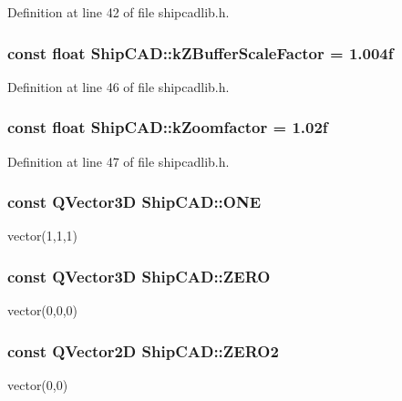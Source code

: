 Definition at line 42 of file shipcadlib.\-h.

\hypertarget{namespaceShipCAD_a519c591e5f5e3f60603b3133a4a2094e}{
\subsubsection[{k\-Z\-Buffer\-Scale\-Factor}]{\setlength{\rightskip}{0pt plus 5cm}const float Ship\-C\-A\-D\-::k\-Z\-Buffer\-Scale\-Factor = 1.\-004f}}\label{namespaceShipCAD_a519c591e5f5e3f60603b3133a4a2094e}


Definition at line 46 of file shipcadlib.\-h.

\hypertarget{namespaceShipCAD_a80babe3fef93f1117e1c410f8d3c22c2}{
\subsubsection[{k\-Zoomfactor}]{\setlength{\rightskip}{0pt plus 5cm}const float Ship\-C\-A\-D\-::k\-Zoomfactor = 1.\-02f}}\label{namespaceShipCAD_a80babe3fef93f1117e1c410f8d3c22c2}


Definition at line 47 of file shipcadlib.\-h.

\hypertarget{namespaceShipCAD_ad454d484187a50b115d2e77055617816}{
\subsubsection[{O\-N\-E}]{\setlength{\rightskip}{0pt plus 5cm}const Q\-Vector3\-D Ship\-C\-A\-D\-::\-O\-N\-E}}\label{namespaceShipCAD_ad454d484187a50b115d2e77055617816}
vector(1,1,1) \hypertarget{namespaceShipCAD_a949bc53a1634b268b43de672807480fb}{
\subsubsection[{Z\-E\-R\-O}]{\setlength{\rightskip}{0pt plus 5cm}const Q\-Vector3\-D Ship\-C\-A\-D\-::\-Z\-E\-R\-O}}\label{namespaceShipCAD_a949bc53a1634b268b43de672807480fb}
vector(0,0,0) \hypertarget{namespaceShipCAD_ab47218dccdf4c94d5989b2e5b13d8603}{
\subsubsection[{Z\-E\-R\-O2}]{\setlength{\rightskip}{0pt plus 5cm}const Q\-Vector2\-D Ship\-C\-A\-D\-::\-Z\-E\-R\-O2}}\label{namespaceShipCAD_ab47218dccdf4c94d5989b2e5b13d8603}
vector(0,0) 